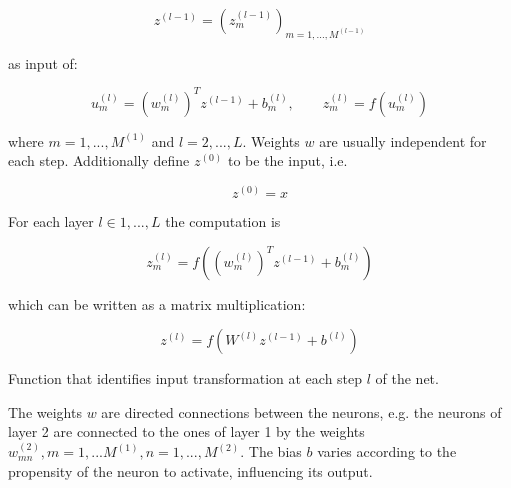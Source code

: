 \begin{Equation}[H]
	\centering
	\begin{equation} \label{eq:neurbas2}
		z^{(l-1)} = (z^{(l-1)}_m)_{m=1,...,M^{(l-1)}}
	\end{equation}	
\end{Equation}

\noindent as input of:

\begin{Equation}[H]
	\centering
	\begin{equation} \label{eq:neurbas3}
		u^{(l)}_m = (w^{(l)}_m)^T z^{(l-1)} + b^{(l)}_m,  
		\quad \quad
		z^{(l)}_m = f(u^{(l)}_m)
	\end{equation}
\end{Equation}

\noindent where $m=1,...,M^{(1)}$ and $l=2,...,L$. Weights $w$ are usually independent for each step. Additionally define $z^{(0)}$ to be the input, i.e.

\begin{Equation}[H]
	\centering
	\begin{equation} \label{eq:neurbas4}
		z^{(0)} = x
	\end{equation}
\end{Equation}

\noindent For each layer $l \in 1,...,L$ the computation is

\begin{Equation}[H]
	\centering
	\begin{equation} \label{eq:neurbas5}
		z^{(l)}_m = f( (w^{(l)}_m)^T z^{(l-1)} + b^{(l)}_m)
	\end{equation}
\end{Equation}

\noindent which can be written as a matrix multiplication:

\begin{Equation}[H]
	\centering
	\begin{equation} \label{eq:forwpropag}
		z^{(l)} = f( W^{(l)} z^{(l-1)} + b^{(l)})
	\end{equation}
	\caption[Forward propagation.]{Function that identifies input transformation at each step $l$ of the net.}	
\end{Equation}

\noindent The weights $w$ are directed connections between the neurons, e.g. the neurons of layer 2 are connected to the ones of layer 1 by the weights $w^{(2)}_{mn}, m=1,...M^{(1)}, n=1,...,M^{(2)}$. The bias $b$ varies according to the propensity of the neuron to activate, influencing its output. \\

